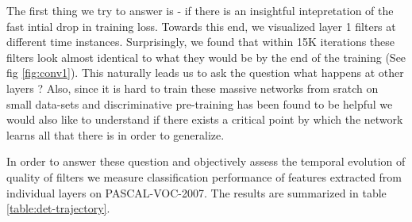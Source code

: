 \documentclass[runningheads]{llncs}
\begin{document}
The first thing we try to answer is - if there is an insightful intepretation of the fast intial drop in training loss. Towards this end, we visualized layer 1 filters at different time instances. Surprisingly, we found that within 15K iterations these filters look almost identical to what they would be by the end of the training (See fig \ref{fig:conv1}). This naturally leads us to ask the question what happens at other layers ? Also, since it is hard to train these massive networks from sratch on small data-sets and discriminative pre-training has been found to be helpful we would also like to understand if there exists a critical point by which the network learns all that there is in order to generalize.  

In order to answer these question and objectively assess the temporal evolution of quality of filters we measure classification performance of features extracted from individual layers on PASCAL-VOC-2007.  The results are summarized in table \ref{table:det-trajectory}. 
\end{document}
